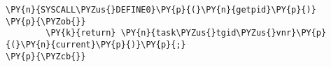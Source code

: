 \begin{Verbatim}[commandchars=\\\{\}]
\PY{n}{SYSCALL\PYZus{}DEFINE0}\PY{p}{(}\PY{n}{getpid}\PY{p}{)}
\PY{p}{\PYZob{}}
        \PY{k}{return} \PY{n}{task\PYZus{}tgid\PYZus{}vnr}\PY{p}{(}\PY{n}{current}\PY{p}{)}\PY{p}{;}
\PY{p}{\PYZcb{}}
\end{Verbatim}
